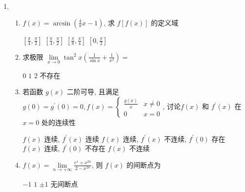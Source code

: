 





\begin{enumerate}
	\item
	\begin{enumerate}
		\item
		$f(x)=\arcsin \left(\frac{4}{\pi} x-1\right)$, 求 $f[f(x)]$ 的定义域  
		
		
		
	\fourchoices
	{$\left[\frac{\pi}{4}, \frac{\pi}{2}\right]$}
	{$\left[\frac{\pi}{4}, \frac{\pi}{2}\right]$}
	{$\left[\frac{\pi}{8}, \frac{\pi}{4}\right]$}
	{$\left[0, \frac{\pi}{2}\right]$}
	

	\item 
	求极限 $\lim\limits _{x \rightarrow 0} \tan ^{2} x\left(\frac{1}{\sin x}+\frac{1}{x^{2}}\right)=$  
	
	
	
\fourchoices
{$ 0 $}
{$ 1 $}
{$ 2 $}
{不存在}

\item 
若函数 $g(x)$ 二阶可导, 且满足 $g(0)=g^{\prime}(0)=0, f(x)=\left\{\begin{array}{cl}\frac{g(x)}{x} & x \neq 0 \\ 0 & x=0\end{array}\right.$, 讨论$f(x)$ 和 $f^{\prime}(x)$ 在 $x=0$ 处的连续性  

	
\fourchoices
{$f(x)$ 连续, $f^{\prime}(x)$ 连续}
{$f(x)$ 连续, $f^{\prime}(x)$ 不连续, $f^{\prime}(0)$ 存在}
{$f(x)$ 连续, $f^{\prime}(0)$ 不存在}
{$f(x)$ 不连续	}


\item 
$f(x)=\lim\limits _{n \rightarrow+\infty} \frac{e^{x}+x^{2 n}}{2-x^{2 n}}$, 则 $f(x)$ 的间断点为  




\fourchoices
{$-1$}
{$ 1 $}
{$ \pm 1 $}
{无间断点}



\end{enumerate}
\end{enumerate}
